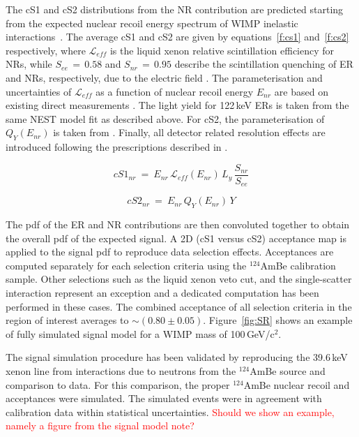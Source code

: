 The cS1 and cS2 distributions from the NR contribution are predicted starting from the expected nuclear recoil energy spectrum
of WIMP inelastic interactions~\cite{Baudis:2013bba}. The average cS1 and cS2 are given by equations~\ref{f:cs1} and~\ref{f:cs2} respectively,
where $\mathcal{L}_{eff}$ is the liquid xenon relative scintillation efficiency for NRs, while $S_{ee} \, = \, 0.58$  and $S_{nr} \, = \, 0.95$ describe the scintillation 
quenching  of ER and NRs, respectively, due to the electric field \cite{ScintQuenching}. The parameterisation and uncertainties of $\mathcal{L}_{eff}$ as a function of nuclear recoil energy $E_{nr}$ are based on existing 
direct measurements \cite{run8Result}. The light yield for 122\,keV ERs is taken from the same NEST model fit as described above. For cS2, the parameterisation 
of $Q_{Y}(E_{nr})$ is taken from \cite{QY}. Finally, all detector related resolution effects are introduced following the prescriptions described in \cite{Aprile:2012vw}.

\begin{equation}
cS1_{nr} ~=~ E_{nr} \, \mathcal{L}_{eff}(E_{nr}) \, L_{y} \, \frac{S_{nr}}{S_{ee}}
\label{f:cs1}
\end{equation}

\begin{equation}
cS2_{nr}  ~ = ~ E_{nr} \, Q_{Y}(E_{nr}) \, Y
\label{f:cs2}
\end{equation}

The pdf of the ER and NR contributions are then convoluted together to obtain the overall pdf of the expected signal.
A 2D (cS1 versus cS2) acceptance map is applied to the signal pdf to reproduce data selection effects. Acceptances are computed separately for each selection 
criteria using the $^{124}$AmBe calibration sample. Other selections such as the liquid xenon veto cut, and the single-scatter interaction represent an exception  and 
a dedicated computation has been performed in these cases. The combined acceptance  of all selection criteria in the region of interest averages to $\sim$$(0.80\pm0.05)$. 
Figure~\ref{fig:SR} shows an example of fully simulated signal model for a WIMP mass of 100\,GeV/c$^2$. 

The signal simulation procedure has been validated by reproducing the 39.6\,keV xenon line from interactions due to neutrons from the 
$^{124}$AmBe source and comparison to data. For this comparison, the proper  $^{124}$AmBe nuclear recoil and acceptances
were simulated. The simulated events were in agreement  with calibration data within statistical uncertainties. 
{\textcolor{red} {Should we show an example, namely a figure from the signal model note?}}

